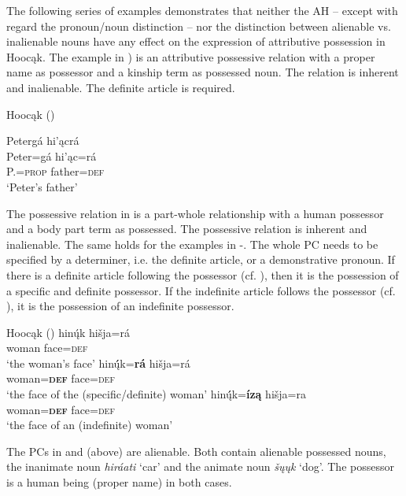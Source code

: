 \documentclass[output=paper]{LSP/langsci}
\begin{document}
The following series of examples demonstrates that neither the AH – except with regard the pronoun/noun distinction – nor the distinction between alienable vs. inalienable nouns have any effect on the expression of attributive possession in Hoocąk. The example in ) is an attributive possessive relation with a proper name as possessor and a kinship term as possessed noun. The relation is inherent and inalienable. The definite article is required.

\ea Hoocąk (\citealt[16]{Helmbrecht2003}) \label{petersfather}

\glll Petergá hi'\k{a}crá\\
Peter=gá       hi'\k{a}c=rá \\
  P.=\textsc{prop} father=\textsc{def} \\
\glt`Peter's father'
\z

The possessive relation in  is a part-whole relationship with a human possessor and a body part term as possessed. The possessive relation is inherent and inalienable. The same holds for the examples in -. The whole PC needs to be specified by a determiner, i.e. the definite article, or a demonstrative pronoun. If there is a definite article following the possessor (cf. ), then it is the possession of a specific and definite possessor. If the indefinite article follows the possessor (cf. ), it is the possession of an indefinite possessor. 

\ea Hoocąk (\citealt[13]{Helmbrecht2003})\label{womansface}
\ea \label{womansfacea}
\gll hinų́k    hišja=rá \\
woman face=\textsc{def} \\
\glt `the woman's face'
\ex\label{womansfaceb}
\gll hinų́́k=\textbf{rá}         hišja=rá \\
woman=\textbf{\textsc{def}} face=\textsc{def} \\
\trans `the face of the (specific/definite) woman'
\ex\label{womansfacec}
\gll hinų́́k=\textbf{íz\k{a}} hišja=ra \\
woman=\textbf{\textsc{def}}  face=\textsc{def} \\ 
\glt `the face of an (indefinite) woman'
\z
\z

The PCs in  and  (above) are alienable. Both contain alienable possessed nouns, the inanimate noun \textit{hiráati} `car' and the animate noun \textit{šųųk} `dog'. The possessor is a human being (proper name) in both cases. 
\end{document}
